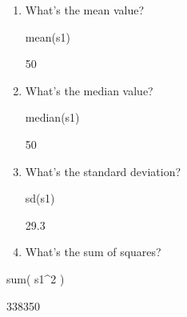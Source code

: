 \begin{enumerate}

\item What's the mean value?\\

\begin{AnswerText}
\begin{Schunk}
\begin{Sinput}
  mean(s1)
\end{Sinput}
\begin{Soutput}
[1] 50
\end{Soutput}
\end{Schunk}
\end{AnswerText}


\item What's the median value?\\

\begin{AnswerText}
\begin{Schunk}
\begin{Sinput}
  median(s1)
\end{Sinput}
\begin{Soutput}
[1] 50
\end{Soutput}
\end{Schunk}
\end{AnswerText}

\item What's the standard deviation?\\

\begin{AnswerText}
\begin{Schunk}
\begin{Sinput}
  sd(s1)
\end{Sinput}
\begin{Soutput}
[1] 29.3
\end{Soutput}
\end{Schunk}
\end{AnswerText}

\item What's the sum of squares?\\
\end{enumerate}

\begin{AnswerText}
\begin{Schunk}
\begin{Sinput}
  sum( s1^2 )
\end{Sinput}
\begin{Soutput}
[1] 338350
\end{Soutput}
\end{Schunk}
\end{AnswerText}

